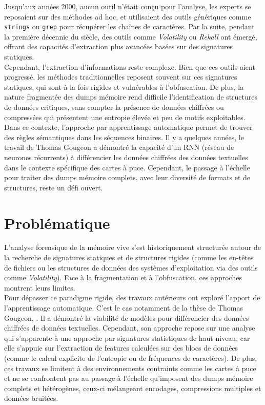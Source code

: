 \documentclass[12pt]{report}
\begin{document}
    Jusqu'aux années 2000, aucun outil n'était conçu pour l'analyse, les experts se reposaient sur des méthodes ad hoc, et utilisaient des outils génériques comme \texttt{strings} ou \texttt{grep} pour récupérer les chaînes de caractères. Par la suite, pendant la première décennie du siècle, des outils comme \textit{Volatility} ou \textit{Rekall} ont émergé, offrant des capacités d'extraction plus avancées basées sur des signatures statiques.\\

    Cependant, l'extraction d'informations reste complexe. Bien que ces outils aient progressé, les méthodes traditionnelles reposent souvent sur ces signatures statiques, qui sont à la fois rigides et vulnérables à l'obfuscation. De plus, la nature fragmentée des dumps mémoire rend difficile l'identification de structures de données critiques, sans compter la présence de données chiffrées ou compressées qui présentent une entropie élevée et peu de motifs exploitables.\\

    Dans ce contexte, l'approche par apprentissage automatique permet de trouver des règles sémantiques dans les séquences binaires. Il y a quelques années, le travail de Thomas Gougeon  a démontré la capacité d'un RNN (réseau de neurones récurrents) à différencier les données chiffrées des données textuelles dans le contexte spécifique des cartes à puce. Cependant, le passage à l'échelle pour traiter des dumps mémoire complets, avec leur diversité de formats et de structures, reste un défi ouvert.

    \section{Problématique}\label{sec:problematique}
    L'analyse forensique de la mémoire vive s'est historiquement structurée autour de la recherche de signatures statiques et de structures rigides (comme les en-têtes de fichiers ou les structures de données des systèmes d'exploitation via des outils comme \textit{Volatility}). Face à la fragmentation et à l'obfuscation, ces approches montrent leurs limites.\\

    Pour dépasser ce paradigme rigide, des travaux antérieurs ont exploré l'apport de l'apprentissage automatique. C'est le cas notamment de la thèse de Thomas Gougeon, . Il a démontré la viabilité de modèles pour différencier des données chiffrées de données textuelles. Cependant, son approche repose sur une analyse qui s'apparente à une approche par signatures statistiques de haut niveau, car elle s'appuie sur l'extraction de features calculées sur des blocs de données (comme le calcul explicite de l'entropie ou de fréquences de caractères). De plus, ces travaux se limitent à des environnements contraints comme les cartes à puce et ne se confrontent pas au passage à l'échelle qu'imposent des dumps mémoire complets et hétérogènes, ceux-ci mélangeant encodages, compressions multiples et données bruitées.\\
    
\end{document}
